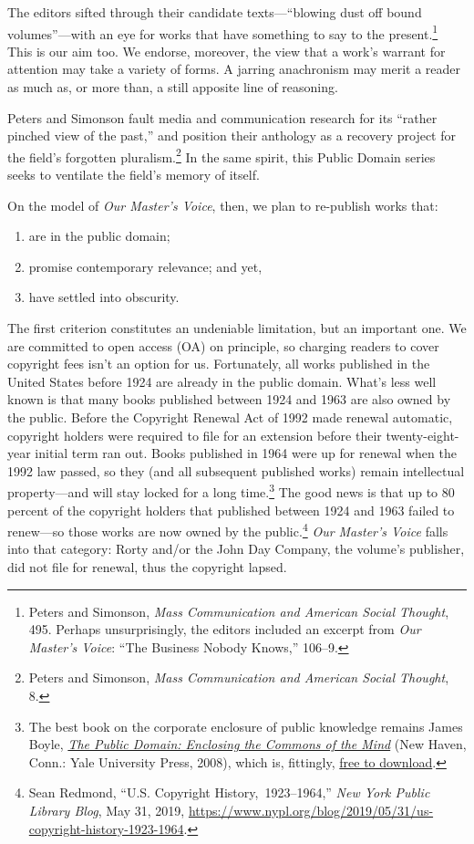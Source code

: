 \documentclass[twoside,nohyper,openany,nobib]{tufte-book}
\begin{document}
\noindent The editors sifted through their candidate texts---``blowing dust off
bound volumes''---with an eye for works that have something to say to
the present.\footnote{Peters and Simonson, \emph{Mass Communication and American Social
  Thought}, 495. Perhaps unsurprisingly, the editors included an excerpt
  from \emph{Our Master's Voice}: ``The Business Nobody Knows,'' 106--9.} This is our aim too. We endorse, moreover, the view that
a work's warrant for attention may take a variety of forms. A jarring
anachronism may merit a reader as much as, or more than, a still
apposite line of reasoning.

Peters and Simonson fault media and communication research for its
``rather pinched view of the past,'' and position their anthology as a
recovery project for the field's forgotten pluralism.\footnote{Peters and Simonson, \emph{Mass Communication and American Social
  Thought}, 8.} In the same
spirit, this Public Domain series seeks to ventilate the field's memory
of itself.

On the model of \emph{Our Master's Voice}, then, we plan to re-publish
works that:

\begin{enumerate}[leftmargin=3\parindent]
\item
  are in the public domain;
\item
  promise contemporary relevance; and yet,
\item
  have settled into obscurity.
\end{enumerate}

\noindent The first criterion constitutes an undeniable limitation, but an
important one. We are committed to open access (OA) on principle, so
charging readers to cover copyright fees isn't an option for us.
Fortunately, all works published in the United States before 1924 are
already in the public domain. What's less well known is that many books
published between 1924 and 1963 are also owned by the public. Before the
Copyright Renewal Act of 1992 made renewal automatic, copyright holders
were required to file for an extension before their twenty-eight-year
initial term ran out. Books published in 1964 were up for renewal when
the 1992 law passed, so they (and all subsequent published works) remain
intellectual property---and will stay locked for a long time.\footnote{The best book on the corporate enclosure of public knowledge remains
  James Boyle, \emph{\href{http://www.worldcat.org/oclc/317471891}{The
  Public Domain: Enclosing the Commons of the Mind}} (New Haven, Conn.:
  Yale University Press, 2008), which is, fittingly,
  \href{http://www.thepublicdomain.org/download/}{free to download}.} The
good news is that up to 80 percent of the copyright holders that
published between 1924 and 1963 failed to renew---so those works are now
owned by the public.\footnote{Sean Redmond, ``U.S. Copyright History,~1923--1964,'' \emph{New York
  Public Library Blog}, May 31, 2019,
  \url{https://www.nypl.org/blog/2019/05/31/us-copyright-history-1923-1964}.} \emph{Our Master's Voice} falls into that
category: Rorty and/or the John Day Company, the volume's publisher, did
not file for renewal, thus the copyright lapsed.
\end{document}
